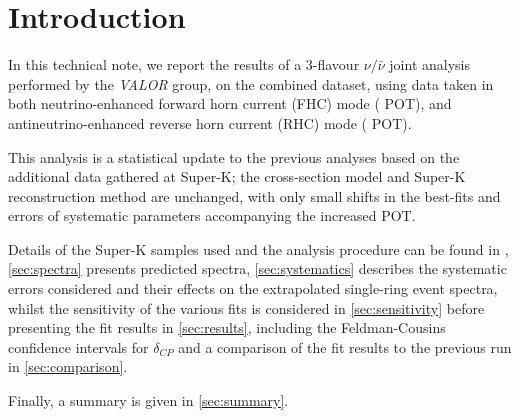 
\section {Introduction}
\label{sec:intro}
In this technical note, we report the results of a 3-flavour $\nu/\bar{\nu}$ joint analysis performed by the {\em VALOR} group, on the combined \RunPeriod dataset, using data taken in both neutrino-enhanced forward horn current (FHC) mode (\TotalPotNu{} POT), and antineutrino-enhanced reverse horn current (RHC) mode (\TotalPotNuBar{} POT).

This analysis is a statistical update to the previous analyses based on the additional data gathered at Super-K; the cross-section model and Super-K reconstruction method are unchanged, with only small shifts in the best-fits and errors of systematic parameters accompanying the increased POT.

Details of the Super-K samples used and the analysis procedure can be found in \cite{OurRun18JointAnalysis3Flavour}, \cref{sec:spectra} presents predicted spectra, \cref{sec:systematics} describes the systematic errors considered and their effects on the extrapolated single-ring event spectra, whilst the sensitivity of the various fits is considered in \cref{sec:sensitivity} before presenting the fit results in \cref{sec:results}, including the Feldman-Cousins confidence intervals for $\delta_{CP}$ and a comparison of the fit results to the previous run in \cref{sec:comparison}.

Finally, a summary is given in \cref{sec:summary}.

\clearpage
